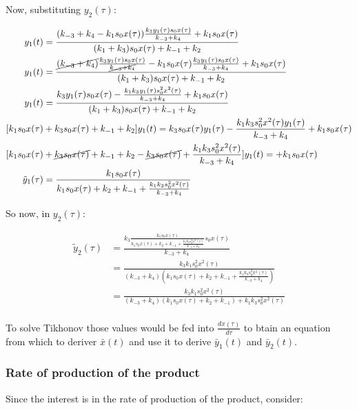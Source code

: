     Now, substituting $y_2(\tau)$:

    \begin{align*}
      y_1(t) &= \frac{(k_{-3} + k_4 - k_1s_0x(\tau))\frac{k_3y_1(\tau)s_0x(\tau)}{k_{-3}+k_4} + k_1s_0x(\tau)}{(k_1 + k_3)s_0x(\tau)+k_{-1}+k_2}\\
      y_1(t) &= \frac{\cancel{(k_{-3} + k_4)}\frac{k_3y_1(\tau)s_0x(\tau)}{\cancel{k_{-3}+k_4}} - k_1s_0x(\tau)\frac{k_3y_1(\tau)s_0x(\tau)}{k_{-3} + k_4} + k_1s_0x(\tau)}{(k_1+k_3)s_0x(\tau) + k_{-1} + k_2}\\
      y_1(t) &=\frac{k_3y_1(\tau)s_0x(\tau) - \frac{k_1k_3y_1(\tau)s_0^2x^2(\tau)}{k_{-3} + k_4} + k_1s_0x(\tau)}{(k_1+k_3)s_0x(\tau) + k_{-1} + k_2}\\
      [k_1s_0x(\tau) &+ k_3s_0x(\tau) + k_{-1} + k_2]y_1(t) = k_3s_0x(\tau)y_1(\tau) - \frac{k_1k_3s_0^2x^2(\tau)y_1(\tau)}{k_{-3} + k_4} + k_1s_0x(\tau)\\
      [k_1s_0x(\tau) &+ \cancel{k_3s_0x(\tau)} + k_{-1} + k_2 - \cancel{k_3s_0x(\tau)} + \frac{k_1k_3s_0^2x^2(\tau)}{k_{-3} + k_4}]y_1(t) = + k_1s_0x(\tau)\\
      \tilde{y}_1(\tau) &= \frac{k_1s_0x(\tau)}{k_1s_0x(\tau) + k_2 + k_{-1} + \frac{k_1k_3s_0^2x^2(\tau)}{k_{-3} + k_4}}\\
    \end{align*}

    So now, in $y_2(\tau)$:

    \begin{align*}
      \tilde{y}_2(\tau) &= \frac{k_3\frac{k_1s_0x(\tau)}{k_1s_0x(\tau) + k_2 + k_{-1} + \frac{k_1k_3s_0^2x^2(\tau)}{k_{-3} + k_4}}s_0x(\tau)}{k_{-3}+k_4}\\
                        &= \frac{k_3k_1s^2_0x^2(\tau)}{(k_{-3}+k_4)\left(k_1s_0x(\tau) + k_2 + k_{-1} + \frac{k_1k_3s_0^2x^2(\tau)}{k_{-3} + k_4}\right)}\\
                        &= \frac{k_3k_1s^2_0x^2(\tau)}{(k_{-3}+k_4)(k_1s_0x(\tau) + k_2 + k_{-1}) + k_1k_3s_0^2x^2(\tau)}\\
    \end{align*}

    To solve Tikhonov those values would be fed into $\frac{dx(\tau)}{d\tau}$ to btain an equation from which to deriver $\bar{x}(t)$ and use it to derive $\bar{y}_1(t)$ and $\bar{y}_2(t)$.

    \subsubsection{Rate of production of the product}
    Since the interest is in the rate of production of the product, consider:

